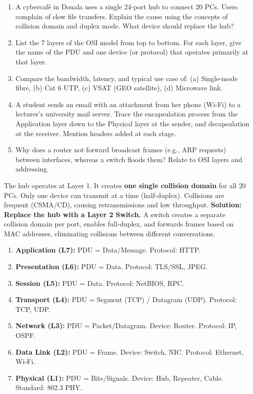 \documentclass[11pt]{article}
\begin{document}
\begin{exercice}
\begin{enumerate}
    \item A cybercafé in Douala uses a single 24-port hub to connect 20 PCs. Users complain of slow file transfers. Explain the cause using the concepts of collision domain and duplex mode. What device should replace the hub?
    \item List the 7 layers of the OSI model from top to bottom. For each layer, give the name of the PDU and one device (or protocol) that operates primarily at that layer.
    \item Compare the bandwidth, latency, and typical use case of: (a) Single-mode fibre, (b) Cat 6 UTP, (c) VSAT (GEO satellite), (d) Microwave link.
    \item A student sends an email with an attachment from her phone (Wi-Fi) to a lecturer's university mail server. Trace the encapsulation process from the Application layer down to the Physical layer at the sender, and decapsulation at the receiver. Mention headers added at each stage.
    \item Why does a router not forward broadcast frames (e.g., ARP requests) between interfaces, whereas a switch floods them? Relate to OSI layers and addressing.
\end{enumerate}
\end{exercice}

\begin{corrige}[Exercise 1]
The hub operates at Layer 1. It creates \textbf{one single collision domain} for all 20 PCs. Only one device can transmit at a time (half-duplex). Collisions are frequent (CSMA/CD), causing retransmissions and low throughput. \textbf{Solution: Replace the hub with a Layer 2 Switch.} A switch creates a separate collision domain per port, enables full-duplex, and forwards frames based on MAC addresses, eliminating collisions between different conversations.
\end{corrige}

\begin{corrige}[Exercise 2]
\begin{enumerate}
    \item \textbf{Application (L7):} PDU = Data/Message. Protocol: HTTP.
    \item \textbf{Presentation (L6):} PDU = Data. Protocol: TLS/SSL, JPEG.
    \item \textbf{Session (L5):} PDU = Data. Protocol: NetBIOS, RPC.
    \item \textbf{Transport (L4):} PDU = Segment (TCP) / Datagram (UDP). Protocol: TCP, UDP.
    \item \textbf{Network (L3):} PDU = Packet/Datagram. Device: Router. Protocol: IP, OSPF.
    \item \textbf{Data Link (L2):} PDU = Frame. Device: Switch, NIC. Protocol: Ethernet, Wi-Fi.
    \item \textbf{Physical (L1):} PDU = Bits/Signals. Device: Hub, Repeater, Cable. Standard: 802.3 PHY.
\end{enumerate}
\end{corrige}
\end{document}
